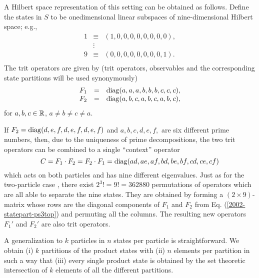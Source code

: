 A Hilbert space representation of this setting can be obtained as
follows.
Define the states in $S$ to be onedimensional linear subspaces of
nine-dimensional Hilbert space; e.g.,
\begin{equation}
\begin{array}{llll}
1 &\equiv& (1,0,0,0,0,0,0,0,0),\\
  &\vdots&\\
9 &\equiv& (0,0,0,0,0,0,0,0,1).\\
\end{array}
\label{2002-statepart-ps3a}
\end{equation}
The trit operators are given by (trit operators, observables and the
corresponding state partitions will be used synonymously)
\begin{equation}
\begin{array}{llll}
F_1&=& {\rm diag} (a,a,a,b,b,b,c,c,c),\\
F_2&=& {\rm diag} (a,b,c,a,b,c,a,b,c),\\
\end{array}
\label{2002-statepart-ps3top}
\end{equation}
for $a,b,c \in {\Bbb R}$, $a\neq b\neq c\neq a$.

If $F_2= {\rm diag} (d,e,f,d,e,f,d,e,f)$
and $a,b,c,d,e,f,$ are six different prime numbers,
then, due to the uniqueness of prime decompositions,
the two trit operators
can be combined to a single
``context'' operator
\begin{equation}
C=F_1\cdot F_2=F_2\cdot F_1=
{\rm diag} (ad,ae,af,bd,be,bf,cd,ce,cf)
\label{2002-statepart-ps3pd}
\end{equation}
which acts on both particles and has nine different eigenvalues.
Just as for the two-particle case \cite{DonSvo01},
there exist $2^3!=9!=362880$ permutations of operators
which are all able to separate the nine states.
They are obtained by forming a $(2\times 9)$-matrix
whose rows are the diagonal components of $F_1$ and $F_2$
from Eq. (\ref{2002-statepart-ps3top})
and permuting all the columns.
The resulting new operators $F_1'$ and $F_2'$ are also trit operators.





A generalization to $k$ particles in $n$ states per particle is straightforward.
We obtain
(i) $k$ partitions of the product states with
(ii) $n$ elements per partition in such a way that
(iii) every single product state is obtained by the set theoretic intersection of
$k$ elements of all the different partitions.


